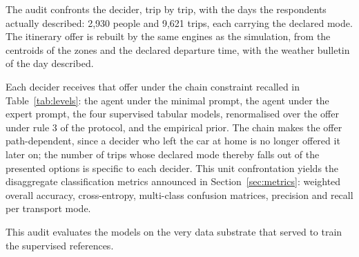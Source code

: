 The audit confronts the decider, trip by trip, with the days the respondents actually described: 2{,}930 people and 9{,}621 trips, each carrying the declared mode. The itinerary offer is rebuilt by the same engines as the simulation, from the centroids of the zones and the declared departure time, with the weather bulletin of the day described.

Each decider receives that offer under the chain constraint recalled in Table~\ref{tab:levels}: the agent under the minimal prompt, the agent under the expert prompt, the four supervised tabular models, renormalised over the offer under rule 3 of the protocol, and the empirical prior. The chain makes the offer path-dependent, since a decider who left the car at home is no longer offered it later on; the number of trips whose declared mode thereby falls out of the presented options is specific to each decider. This unit confrontation yields the disaggregate classification metrics announced in Section~\ref{sec:metrics}: weighted overall accuracy, cross-entropy, multi-class confusion matrices, precision and recall per transport mode.

This audit evaluates the models on the very data substrate that served to train the supervised references.

